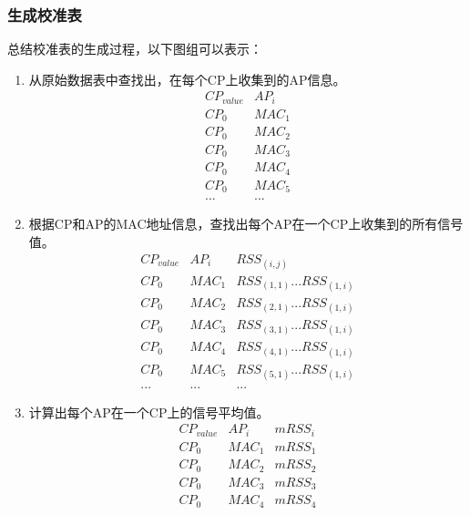 \documentclass[UTF8, twocolumn ]{ctexart}
\begin{document}
\subsubsection{生成校准表}
总结校准表的生成过程，以下图组可以表示：

\begin{enumerate}
\item 从原始数据表中查找出，在每个CP上收集到的AP信息。
  \begin{equation}
    \begin{array}{c|c}
      CP_{value} & AP_{i} \\ \hline
      CP_{0} & MAC_{1} \\
      CP_{0} & MAC_{2} \\
      CP_{0} & MAC_{3} \\
      CP_{0} & MAC_{4} \\
      CP_{0} & MAC_{5} \\
      ... & ...
    \end{array}
  \end{equation}
\item 根据CP和AP的MAC地址信息，查找出每个AP在一个CP上收集到的所有信号值。
  \begin{equation}
    \begin{array}{c|c|c}
      CP_{value} & AP_{i} & RSS_{(i,j)} \\ \hline
      CP_{0} & MAC_{1} & RSS_{(1,1)}...RSS_{(1,i)} \\
      CP_{0} & MAC_{2} & RSS_{(2,1)}...RSS_{(1,i)} \\
      CP_{0} & MAC_{3} & RSS_{(3,1)}...RSS_{(1,i)} \\
      CP_{0} & MAC_{4} & RSS_{(4,1)}...RSS_{(1,i)} \\
      CP_{0} & MAC_{5} & RSS_{(5,1)}...RSS_{(1,i)} \\
      ... & ... & ...
    \end{array}
  \end{equation}
\item 计算出每个AP在一个CP上的信号平均值。
  \begin{equation}
    \begin{array}{c|c|c}
      CP_{value} & AP_{i} & mRSS_{i} \\ \hline
      CP_{0} & MAC_{1} & mRSS_{1} \\
      CP_{0} & MAC_{2} & mRSS_{2} \\
      CP_{0} & MAC_{3} & mRSS_{3} \\
      CP_{0} & MAC_{4} & mRSS_{4} \\

\end{array}
\end{equation}
\end{enumerate}
\end{document}
